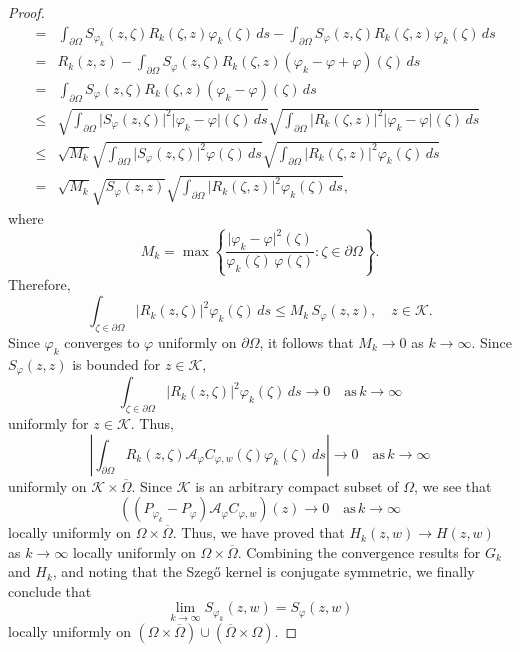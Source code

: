 \documentclass[10pt,a4paper]{amsart}
\begin{document}
\begin{proof}
\begin{eqnarray*}
&=&
\int_{\partial\Omega} S_{\varphi_k}(z,\zeta) R_k(\zeta,z) \varphi_k(\zeta)\,ds
-
\int_{\partial\Omega} S_{\varphi}(z,\zeta) R_k(\zeta,z) \varphi_k(\zeta)\,ds\\
&=&
R_k(z,z)
-
\int_{\partial\Omega} S_{\varphi}(z,\zeta) R_k(\zeta,z) (\varphi_k-\varphi+\varphi)(\zeta)\,ds\\
&=&
\int_{\partial\Omega} S_{\varphi}(z,\zeta) R_k(\zeta,z) (\varphi_k-\varphi)(\zeta)\,ds\\
&\leq&
\sqrt{\int_{\partial\Omega} \vert S_{\varphi}(z,\zeta)\vert^2 \vert\varphi_k-\varphi\vert(\zeta)\,ds}
\sqrt{\int_{\partial\Omega} \vert R_k(\zeta,z)\vert^2 \vert\varphi_k-\varphi\vert(\zeta)\,ds}\\
&\leq&
\sqrt{M_k}
\sqrt{\int_{\partial\Omega} \vert S_{\varphi}(z,\zeta)\vert^2 \varphi(\zeta)\,ds}
\sqrt{\int_{\partial\Omega} \vert R_k(\zeta,z)\vert^2 \varphi_k(\zeta)\,ds}\\
&=&
\sqrt{M_k} \sqrt{S_{\varphi}(z,z)}
\sqrt{\int_{\partial\Omega} \vert R_k(\zeta,z)\vert^2 \varphi_k(\zeta)\,ds},
\end{eqnarray*}
where
\[
M_k=\max\left\lbrace \frac{\vert \varphi_k-\varphi\vert^2(\zeta)}{\varphi_k(\zeta)\,\varphi(\zeta)}: \zeta\in\partial\Omega\right\rbrace.
\]
Therefore,
\[
\int_{\zeta\in\partial\Omega} \vert R_k(z,\zeta)\vert^2 \varphi_k(\zeta)\,ds
\leq 
M_k\,
S_{\varphi}(z,z),\quad z\in\mathcal{K}.
\]
Since $\varphi_k$ converges to $\varphi$ uniformly on $\partial\Omega$, it follows that $M_k\rightarrow 0$ as $k\rightarrow\infty$. Since $S_{\varphi}(z,z)$ is bounded for $z\in \mathcal{K}$, 
\[
\int_{\zeta\in\partial\Omega} \vert R_k(z,\zeta)\vert^2 \varphi_k(\zeta)\,ds
\rightarrow 0 \quad \text{as}\,k\rightarrow\infty
\]
uniformly for $z\in\mathcal{K}$. Thus,
\[
\left\lvert
\int_{\partial\Omega} R_k(z,\zeta)\mathcal{A}_{\varphi} C_{\varphi,w}(\zeta) \varphi_k(\zeta)\,ds
\right\rvert
\rightarrow 0 
\quad \text{as}\,
k\rightarrow \infty
\]
uniformly on $\mathcal{K}\times\overline{\Omega}$. Since $\mathcal{K}$ is an arbitrary compact subset of $\Omega$, we see that
\[
((P_{\varphi_k}-P_{\varphi})\mathcal{A}_{\varphi} C_{\varphi,w})(z)\rightarrow 0
\quad
\text{as}\, k\rightarrow\infty
\]
locally uniformly on $\Omega\times\overline{\Omega}$. Thus, we have proved that $H_k(z,w)\rightarrow H(z,w)$ as $k\rightarrow\infty$ locally uniformly on $\Omega\times\overline{\Omega}$. Combining the convergence results for $G_k$ and $H_k$, and noting that the Szeg\H{o} kernel is conjugate symmetric, we finally conclude that
\[
\lim_{k\rightarrow\infty} S_{\varphi_k}(z,w)=S_{\varphi}(z,w)
\]
locally uniformly on $(\Omega\times\overline{\Omega})\cup (\overline{\Omega}\times\Omega)$.
\end{proof}
\end{document}
